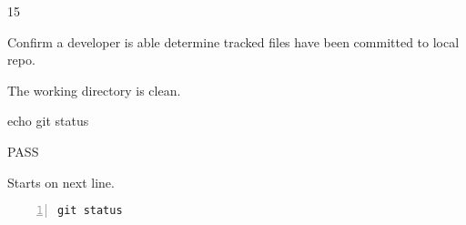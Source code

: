 \begin{description}[align=right,leftmargin=3.2cm,labelindent=3.0cm]
\item[Step:] 15
\item[Confirm:] Confirm a developer is able determine tracked files have been committed to local repo.
\item[Expectation:] The working directory is clean.
\item[Command:] echo git  status
\item[Test Result:] PASS
\item[Evidence:] Starts on next line.
\end{description}
\begin{lstlisting}[numbers=left]
git status

\end{lstlisting}
